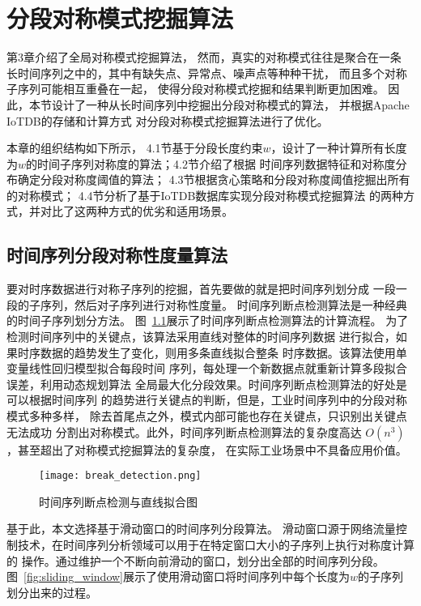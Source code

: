 
\chapter{分段对称模式挖掘算法}
第3章介绍了全局对称模式挖掘算法，
然而，真实的对称模式往往是聚合在一条
长时间序列之中的，其中有缺失点、异常点、噪声点等种种干扰，
而且多个对称子序列可能相互重叠在一起，
使得分段对称模式挖掘和结果判断更加困难。
因此，本节设计了一种从长时间序列中挖掘出分段对称模式的算法，
并根据Apache IoTDB的存储和计算方式
对分段对称模式挖掘算法进行了优化。

本章的组织结构如下所示，
4.1节基于分段长度约束$w$，设计了一种计算所有长度
为$w$的时间子序列对称度的算法；4.2节介绍了根据
时间序列数据特征和对称度分布确定分段对称度阈值的算法；
4.3节根据贪心策略和分段对称度阈值挖掘出所有的对称模式；
4.4节分析了基于IoTDB数据库实现分段对称模式挖掘算法
的两种方式，并对比了这两种方式的优劣和适用场景。

\section{时间序列分段对称性度量算法}
要对时序数据进行对称子序列的挖掘，首先要做的就是把时间序列划分成
一段一段的子序列，然后对子序列进行对称性度量。
时间序列断点检测算法是一种经典的时间子序列划分方法\cite{DBLP:conf/igarss/UrbanHZMGBMMFRH21}。
图~\ref{fig:break_detection}展示了时间序列断点检测算法的计算流程。
为了检测时间序列中的关键点，该算法采用直线对整体的时间序列数据
进行拟合，如果时序数据的趋势发生了变化，则用多条直线拟合整条
时序数据。该算法使用单变量线性回归模型拟合每段时间
序列，每处理一个新数据点就重新计算多段拟合误差，利用动态规划算法
全局最大化分段效果。时间序列断点检测算法的好处是可以根据时间序列
的趋势进行关键点的判断，但是，工业时间序列中的分段对称模式多种多样，
除去首尾点之外，模式内部可能也存在关键点，只识别出关键点无法成功
分割出对称模式。此外，时间序列断点检测算法的复杂度高达
$O\left(n^{3}\right)$，甚至超出了对称模式挖掘算法的复杂度，
在实际工业场景中不具备应用价值。
\begin{figure}
  \centering
  \texttt{[image: break\_detection.png]}
  \caption{时间序列断点检测与直线拟合图}
  \label{fig:break_detection}
\end{figure}

基于此，本文选择基于滑动窗口的时间序列分段算法\cite{DBLP:conf/pkdd/LestiS17}。
滑动窗口源于网络流量控制技术，在时间序列分析领域可以用于在特定窗口大小的子序列上执行对称度计算的
操作。通过维护一个不断向前滑动的窗口，划分出全部的时间序列分段。
图~\ref{fig:sliding_window}展示了使用滑动窗口将时间序列中每个长度为$w$的子序列划分出来的过程。

